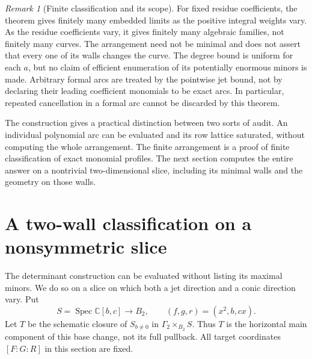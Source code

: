 \documentclass[11pt,reqno]{amsart}
\numberwithin{equation}{section}
\theoremstyle{definition}\newtheorem{definition}[theorem]{Definition}
\theoremstyle{remark}\newtheorem{remark}[theorem]{Remark}
\newcommand{\C}{\mathbb C}\newcommand{\Q}{\mathbb Q}
\DeclareMathOperator{\Spec}{Spec}\DeclareMathOperator{\PGL}{PGL}
\begin{document}
\begin{remark}[Finite classification and its scope]
\label{rem:finite-classification-v167}
For fixed residue coefficients, the theorem gives finitely many
embedded limits as the positive integral weights vary. As the
residue coefficients vary, it gives finitely many algebraic
families, not finitely many curves. The arrangement need not be
minimal and does not assert that every one of its walls changes
the curve. The degree bound is uniform for each $a$, but no
claim of efficient enumeration of its potentially enormous minors
is made. Arbitrary formal arcs are treated by the pointwise jet
bound, not by declaring their leading coefficient monomials to be
exact arcs. In particular, repeated cancellation in a formal arc
cannot be discarded by this theorem.
\end{remark}

The construction gives a practical distinction between two sorts
of audit. An individual polynomial arc can be evaluated and its
row lattice saturated, without computing the whole arrangement.
The finite arrangement is a proof of finite classification of
exact monomial profiles. The next section computes the entire
answer on a nontrivial two-dimensional slice, including its
minimal walls and the geometry on those walls.

\section{A two-wall classification on a nonsymmetric slice}
\label{sec:two-wall-v167}
The determinant construction can be evaluated without listing its
maximal minors. We do so on a slice on which both a jet direction
and a conic direction vary. Put
\[
 S=\Spec\C[b,c]\longrightarrow B_2,\qquad
                  (f,g,r)=(x^2,b,cx).
\]
Let $T$ be the schematic closure of $S_{b\ne0}$ in
$\Gamma_2\times_{B_2}S$. Thus $T$ is the horizontal main component
of this base change, not its full pullback. All target coordinates
$[F:G:R]$ in this section are fixed.
\end{document}
